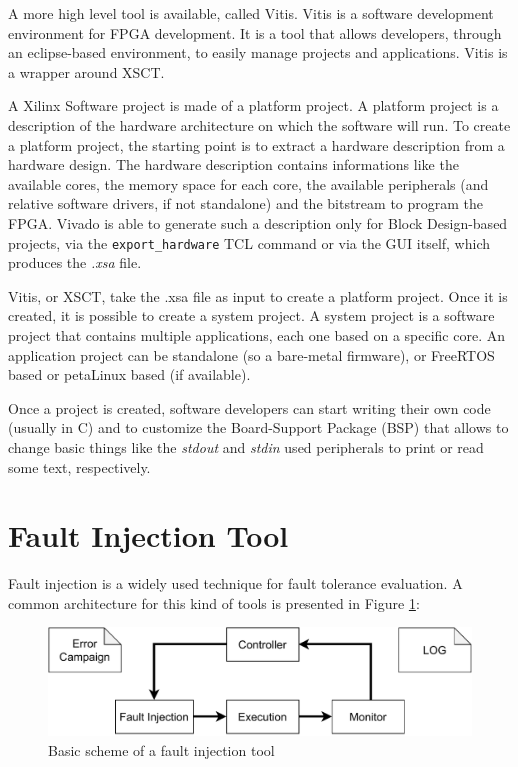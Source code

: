 A more high level tool is available, called Vitis. Vitis is a software development environment for FPGA development. It is a tool that allows developers, through an eclipse-based environment, to easily manage projects and applications. Vitis is a wrapper around XSCT. \bigskip

A Xilinx Software project is made of a platform project. A platform project is a description of the hardware architecture on which the software will run. To create a platform project, the starting point is to extract a hardware description from a hardware design. The hardware description contains informations like the available cores, the memory space for each core, the available peripherals (and relative software drivers, if not standalone) and the bitstream to program the FPGA. Vivado is able to generate such a description only for Block Design-based projects, via the \texttt{export\_hardware} TCL command or via the GUI itself, which produces the \textit{.xsa} file. \bigskip

Vitis, or XSCT, take the .xsa file as input to create a platform project. Once it is created, it is possible to create a system project. A system project is a software project that contains multiple applications, each one based on a specific core. An application project can be standalone (so a bare-metal firmware), or FreeRTOS based or petaLinux based (if available). \bigskip

Once a project is created, software developers can start writing their own code (usually in C) and to customize the Board-Support Package (BSP) that allows to change basic things like the \textit{stdout} and \textit{stdin} used peripherals to print or read some text, respectively.

\section{Fault Injection Tool}
\label{sec:fitollo}

Fault injection is a widely used technique for fault tolerance evaluation. A common architecture for this kind of tools is presented in Figure \ref{fig:fi_example}:

\begin{figure}[H]
\centering
\includegraphics[width=0.95\linewidth]{images/chapter3/fi_env.pdf}
\caption{Basic scheme of a fault injection tool \cite{Ruano2021-wy}}
\label{fig:fi_example}
\end{figure}

